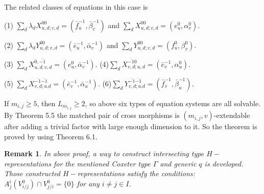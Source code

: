 \def\CTEXPreproc{Created by ctex v0.2.12, don't edit!}\documentclass[11pt]{article}
\newtheorem{rem}{Remark}[section]
\begin{document}
\begin{pf}
The related classes of equations in this case is

\noindent(1) $\sum_d  \lambda_d  X^{00}_{u,d;v,d} = ( \bar{f}^{-1}_u ,\bar{\beta}^{-1}_v  )  $ and $\sum_d   X^{00}_{u,d;v,d} = ( e^0 _u ,\alpha^0 _v )  $.

\noindent (2) $\sum_d  \lambda_d  Y^{00}_{u,d;v,d} = ( \bar{e}^{-1}_u ,\bar{\alpha}^{-1}_v  )  $ and $\sum_d   Y^{00}_{u,d;v,d} = ( f^0 _u ,\beta^0 _v )  $.

\noindent(3) $\sum_d X^{0,\bar{-1}}_{u,d;v,d} =  (e^0 _u , \bar{\alpha}^{-1}_v ) $.
(4)$\sum_d X^{\bar{-1} 0}_{v,d;u,d}= ( \bar{e}^{-1}_v ,\alpha^0 _u ) $.

\noindent(5) $\sum_d X^{\bar{-1} \bar{-1} }_{v,d;u.d} = ( \bar{e}^{-1}_v , \bar{\alpha}^{-1}_u  )   $.
(6)$\sum_d Y^{\bar{-1} \bar{-1} }_{v,d;u.d} = ( \bar{f}^{-1}_v , \bar{\beta}^{-1}_u  )   $.

If $m_{i,j}\geq 5$, then $L_{m_{i,j}}\geq 2$, so above six types of equation systems  are  all solvable. By Theorem 5.5 the matched pair of cross morphisms is
$(m_{i,j} ,v)$-extendable after adding a trivial factor with large enough dimension to it. So the theorem is proved by using Theorem 6.1.


\end{pf}

\begin{rem}
In above proof, a way to construct intersecting type $H-$representations for the mentioned Coxeter type $\Gamma$ and generic $q$ is developed. Those constructed $H-$representations satisfy the conditions: $A^i _j ( V^0 _{i/j}  ) \cap V^0 _{j/i} =\{ 0\}   $ for any $i\neq j \in I$.
\end{rem}
\end{document}
